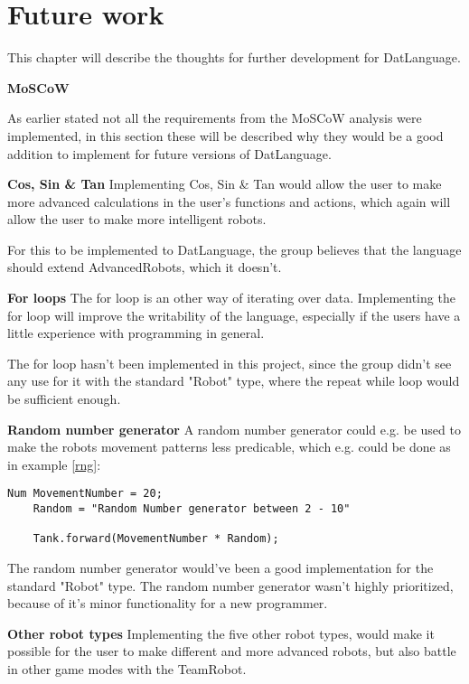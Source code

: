 \chapter{Future work}
This chapter will describe the thoughts for further development for DatLanguage. \newline

\textbf{\Large{MoSCoW}}

As earlier stated not all the requirements from the MoSCoW analysis were implemented, in this section these will be described why they would be a good addition to implement for future versions of DatLanguage.

\textbf{Cos, Sin \& Tan}\newline
Implementing Cos, Sin \& Tan would allow the user to make more advanced calculations in the user's functions and actions, which again will allow the user to make more intelligent robots. 

For this to be implemented to DatLanguage, the group believes that the language should extend AdvancedRobots, which it doesn't. 

\textbf{For loops} \newline
The for loop is an other way of iterating over data. Implementing the for loop will improve the writability of the language, especially if the users have a little experience with programming in general.

The for loop hasn't been implemented in this project, since the group didn't see any use for it with the standard "Robot" type, where the repeat while loop would be sufficient enough. 

\textbf{Random number generator}\newline
A random number generator could e.g. be used to make  the robots movement patterns less predicable, which e.g. could be done as in example \ref{rng}: 

\begin{lstlisting}[caption={Simple example of a random number generator}, label={rng}]
	Num MovementNumber = 20;
	Random = "Random Number generator between 2 - 10"
	
	Tank.forward(MovementNumber * Random);
\end{lstlisting}

The random number generator would've been a good implementation for the standard "Robot" type. The random number generator wasn't highly prioritized, because of it's minor functionality for a new programmer.

\textbf{Other robot types}\newline
Implementing the five other robot types, would make it possible for the user to make different and more advanced robots, but also battle in other game modes with the TeamRobot.

